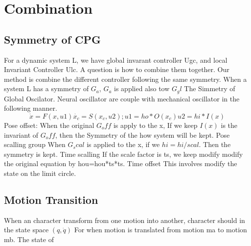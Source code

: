 \section{Combination}

\subsection{Symmetry of CPG}
For a dynamic system L, we have global invarant controller  Ugc, and local Invariant Controller Ulc.
A question is how to combine them together.
Our method is combine the different controller following the same symmetry.
When a system L has a symmetry of $G_a$, $G_a$ is applied also tow $G_gl$
The Simmetry of Global Oscilator.
Neural oscillator are couple with mechanical oscillator in the following manner.
\begin{equation}
\dot{x}=F(x,u1)
\dot{x_c}=S(x_c,u2);
u1=ho*O(x_c)
u2=hi*I(x)
\end{equation}
Pose offset:
When the original $G_off$ is apply to the x,
If we keep $I(x)$ is the invariant of $G_off$, then the Symmetry of the how system will be kept.
Pose scalling group
When $G_scal$ is applied to the x, if we $hi=hi/scal$.
Then the symmetry is kept.
Time scalling
If the scale factor is ts, we keep modify modify the original equation by %
hou=hou*ts*ts.
Time offset
This involves modify the state on the limit circle.
\subsection{Motion Transition}
When an character transform from one motion into another, character should in the state space $(q,\dot{q})$
For when motion is translated from motion ma to motion mb.
The state of %